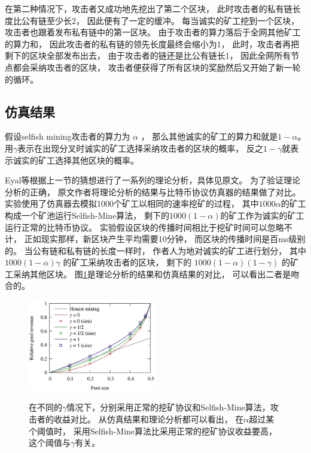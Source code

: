 \documentclass[a4paper, 11pt]{article}
\begin{document}
\begin{CJK*}{UTF8}{gbsn}
    在第二种情况下，攻击者又成功地先挖出了第二个区块，
    此时攻击者的私有链长度比公有链至少长2，
    因此便有了一定的缓冲。
    每当诚实的矿工挖到一个区块，
    攻击者也跟着发布私有链中的第一区块。
    由于攻击者的算力落后于全网其他矿工的算力和，
    因此攻击者的私有链的领先长度最终会缩小为1，
    此时，攻击者再把剩下的区块全部发布出去，
    由于攻击者的链还是比公有链长1，
    因此全网所有节点都会采纳攻击者的区块，
    攻击者便获得了所有区块的奖励然后又开始了新一轮的循环。

    \subsection{仿真结果}

    \indent

    假设selfish mining攻击者的算力为 $ \alpha$ ，
    那么其他诚实的矿工的算力和就是$1 - \alpha$。
    用$\gamma$表示在出现分叉时诚实的矿工选择采纳攻击者的区块的概率，
    反之$1 - \gamma$就表示诚实的矿工选择其他区块的概率。

    Eyal等根据上一节的猜想进行了一系列的理论分析，具体见原文\cite{ref_selfish_mining1}。
    为了验证理论分析的正确，
    原文作者将理论分析的结果与比特币协议仿真器的结果做了对比。
    实验使用了仿真器去模拟1000个矿工以相同的速率挖矿的过程，
    其中$1000\alpha$的矿工构成一个矿池运行Selfish-Mine算法，
    剩下的$1000(1-\alpha)$的矿工作为诚实的矿工运行正常的比特币协议。
    实验假设区块的传播时间相比于挖矿时间可以忽略不计，
    正如现实那样，新区块产生平均需要10分钟，
    而区块的传播时间是百ms级别的。
    当公有链和私有链的长度一样时，
    作者人为地对诚实的矿工进行划分，
    其中 $1000(1-\alpha)\gamma$ 的矿工采纳攻击者的区块，
    剩下的 $1000(1-\alpha)(1-\gamma)$ 的矿工采纳其他区块。
    图\ref{figure:figure1}是理论分析的结果和仿真结果的对比，
    可以看出二者是吻合的。

    \begin{figure}[h]
        \centering
        \includegraphics[width=0.5\textwidth]{figure1}
        \label{figure:figure1}
        \caption{在不同的$\gamma$情况下，分别采用正常的挖矿协议和Selfish-Mine算法，攻击者的收益对比。
        从仿真结果和理论分析都可以看出，
        在$\alpha$超过某个阈值时，
        采用Selfish-Mine算法比采用正常的挖矿协议收益要高，
        这个阈值与$\gamma$有关。}
    \end{figure}


\end{CJK*}
\end{document}

